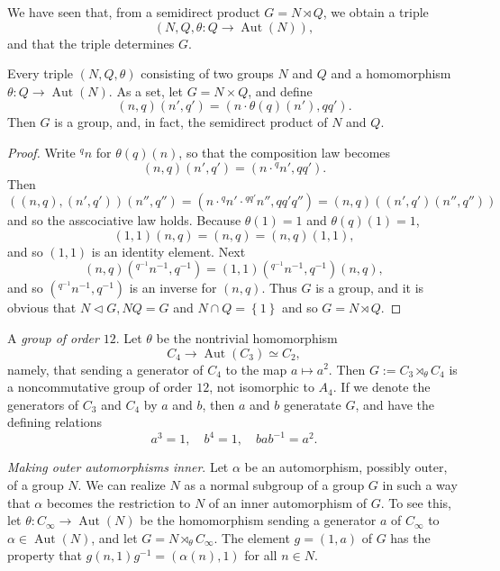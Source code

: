 We have seen that, from a semidirect product \( G = N \rtimes Q \), we obtain a triple
\[
  (N, Q, \theta: Q \to \operatorname{Aut}(N)),
\]
and that the triple determines \( G \).

\begin{proposition}
  \label{proposition-semidirect-composite-group}
  Every triple \( (N, Q, \theta) \) consisting of two groups \( N \) and \( Q \) and a homomorphism \( \theta: Q \to \operatorname{Aut}(N) \).
As a set, let \( G = N \times Q \), and define
\[
  (n, q) (n', q') = (n \cdot \theta(q)(n'), qq').
\]
Then \( G \) is a group, and, in fact, the semidirect product of \( N \) and \( Q \).
\end{proposition}
\begin{proof}
  Write \( {}^qn \) for \( \theta(q)(n) \), so that the composition law becomes
  \[
    (n, q)(n', q') = (n\cdot {}^qn', qq').
  \]
  Then
  \[
    ((n, q), (n', q'))(n'', q'') = (n \cdot {}^q n' \cdot {}^{qq'}n'', qq'q'') = (n, q)((n', q')(n'', q''))
  \]
  and so the asscociative law holds.
  Because \( \theta(1) = 1 \) and \( \theta(q)(1) = 1 \),
  \[
    (1, 1) (n, q) = (n, q) = (n, q)(1, 1),
  \]
  and so \( (1, 1) \) is an identity element.
  Next
  \[
    (n, q)({}^{q^{-1}}n^{-1}, q^{-1}) = (1, 1) ({}^{q^{-1}}n^{-1}, q^{-1})(n, q),
  \]
  and so \( ({}^{q^{-1}}n^{-1}, q^{-1}) \) is an inverse for \( (n, q) \).
  Thus \( G \) is a group, and it is obvious that \( N \triangleleft G, N Q = G \) and \( N \cap Q = \left\lbrace 1 \right\rbrace \) and so \( G = N \rtimes Q \).
\end{proof}


\begin{example}
  \label{example-group-of-order-12}
  A \emph{group of order} \( 12 \).
  Let \( \theta \) be the nontrivial homomorphism
  \[
    C_4 \to \operatorname{Aut}(C_3) \simeq C_2,
  \]
  namely, that sending a generator of \( C_4 \) to the map \( a \mapsto a^2 \).
  Then \( G := C_3 \rtimes_\theta C_4 \) is a noncommutative group of order \( 12 \), not isomorphic to \( A_4 \).
  If we denote the generators of \( C_3 \) and \( C_4 \) by \( a \) and \( b \), then \( a \) and \( b \) generatate \( G \), and have the defining relations
  \[
    a^3 = 1,\quad b^4 = 1,\quad bab^{-1} = a^2.
  \]
\end{example}

\begin{example}
  \label{example-make-outer-automorphisms-inner}
  \emph{Making outer automorphisms inner}.
  Let \( \alpha \) be an automorphism, possibly outer, of a group \( N \).
  We can realize \( N \) as a normal subgroup of a group \( G \) in such a way that \( \alpha \) becomes the restriction to \( N \) of an inner automorphism of \( G \).
  To see this, let \( \theta: C_\infty \to \operatorname{Aut}(N) \) be the homomorphism sending a generator \( a \) of \( C_\infty \) to \( \alpha \in \operatorname{Aut}(N) \), and let \( G = N \rtimes_\theta C_\infty \).
  The element \( g = (1, a) \) of \( G \) has the property that \( g(n, 1)g^{-1} = (\alpha(n), 1) \) for all \( n \in N \).
\end{example}


